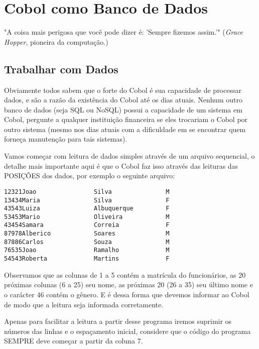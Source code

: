 \chapter{Cobol como Banco de Dados}

\begin{remark}
	"A coisa mais perigosa que você pode dizer é: 'Sempre fizemos assim.'" (\textit{Grace Hopper}, pioneira da computação.) 
\end{remark}

\section{Trabalhar com Dados}
Obviamente todos sabem que o forte do Cobol é sua capacidade de processar dados, e são a razão da existência do Cobol até os dias atuais. Nenhum outro banco de dados (seja SQL ou NoSQL) possui a capacidade de um sistema em Cobol, pergunte a qualquer instituição financeira se eles trocariam o Cobol por outro sistema (mesmo nos dias atuais com a dificuldade em se encontrar quem forneça manutenção para tais sistemas).

Vamos começar com leitura de dados simples através de um arquivo sequencial, o detalhe mais importante aqui é que o Cobol faz isso através das leituras das POSIÇÕES dos dados, por exemplo o seguinte arquivo:

\begin{lstlisting}[]
12321Joao                Silva               M
13434Maria               Silva               F
43543Luiza               Albuquerque         F
53453Mario               Oliveira            M
43454Samara              Correia             F
87978Alberico            Soares              M
87886Carlos              Souza               M
76535Joao                Ramalho             M
54543Roberta             Martins             F
\end{lstlisting}

Observamos que as colunas de 1 a 5 contém a matrícula do funcionários, as 20 próximas colunas (6 a 25) seu nome, as próximas 20 (26 a 35) seu último nome e o carácter 46 contém o gênero. E é dessa forma que devemos informar ao Cobol de modo que a leitura seja informada corretamente.

\begin{note}
	Apenas para facilitar a leitura a partir desse programa iremos suprimir os números das linhas e o espaçamento inicial, considere que o código do programa SEMPRE deve começar a partir da coluna 7.
\end{note}

